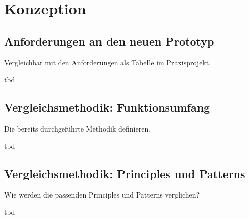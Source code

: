 \section{Konzeption}

\subsection{Anforderungen an den neuen Prototyp}
\color{red}
Vergleichbar mit den Anforderungen als Tabelle im Praxisprojekt.

tbd
\color{black}

\subsection{Vergleichsmethodik: Funktionsumfang}
\color{red}
Die bereits durchgeführte Methodik definieren.

tbd
\color{black}

\subsection{Vergleichsmethodik: Principles und Patterns}
\color{red}
Wie werden die passenden Principles und Patterns verglichen?

tbd
\color{black}
